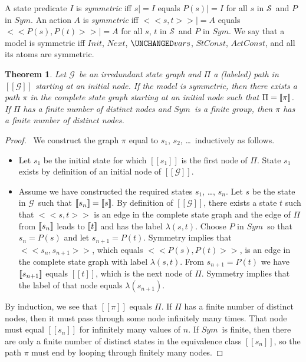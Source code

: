 \documentclass[fleqn,leqno]{article}
\newcommand{\sym}{\ensuremath{Sym}}
\newcommand{\ec}[1]{\mbox{\ensuremath{[\![#1]\!]}}}
\newcommand{\states}{\ensuremath{\mathcal{S}}}
\newcommand{\G}{\ensuremath{\mathcal{G}}}
\newtheorem{theorem}{Theorem}
\begin{document}
A state predicate $I$ is \emph{symmetric} iff $s|=I$ equals $P(s)|=I$
for all $s$ in \states\ and $P$ in \sym.  An action $A$ is
\emph{symmetric} iff $<<s,t>>|=A$ equals $<<P(s),P(t)>>|=A$ for all
$s$, $t$ in \states\ and $P$ in \sym.  We say that a model is symmetric
iff $Init$, $Next$, $\UNCHANGED vars$, $StConst$, $ActConst$, and all
its atoms are symmetric.

\begin{theorem}
Let \G\ be an irredundant state graph and $\Pi$ a (labeled) path in
\ec{\G} starting at an initial node.  If the model is symmetric, then
there exists a path $\pi$ in the complete state graph starting at an
initial node such that $\Pi=\ec{\pi}$.  If $\Pi$ has a finite number
of distinct nodes and \sym\ is a finite group, then $\pi$ has a finite
number of distinct nodes.
\end{theorem}
\begin{proof}
\pf\ We construct the graph $\pi$ equal to $s_{1}$, $s_{2}$, \ldots\
inductively as follows.  
\begin{itemize}
\item Let $s_{1}$ be the initial state
for which \ec{s_{1}} is the first node of $\Pi$.  State $s_{1}$
exists by definition of an initial node of \ec{\G}.

\item Assume we have constructed the required states $s_{1}$, \ldots,
$s_{n}$.  Let $s$ be the state in \G\ such that $\ec{s_{n}}=\ec{s}$.
By definition of \ec{\G}, there exists a state $t$ such that $<<s,t>>$
is an edge in the complete state graph and the edge of $\Pi$ from
$\ec{s_{n}}$ leads to $\ec{t}$ and has the label $\lambda(s,t)$.
Choose $P$ in \sym\ so that $s_{n}=P(s)$ and let $s_{n+1}=P(t)$.
Symmetry implies that $<<s_{n}, s_{n+1}>>$, which equals
$<<P(s), P(t)>>$, is an edge in the complete state graph with
label $\lambda(s,t)$.  From $s_{n+1}=P(t)$ we have $\ec{s_{n+1}}$
equals \ec{t}, which is the next node of $\Pi$.  Symmetry implies
that the label of that node equals $\lambda(s_{n+1})$.  
\end{itemize}
By induction, we see that \ec{\pi} equals $\Pi$.  If $\Pi$ has
a finite number of distinct nodes, then it must pass through some
node infinitely many times.  That node must equal \ec{s_{n}} for
infinitely many values of $n$.  If \sym\ is finite, then there are
only a finite number of distinct states in the equivalence
class \ec{s_{n}}, so the path $\pi$ must end by looping through
finitely many nodes.
\end{proof}
\end{document}
